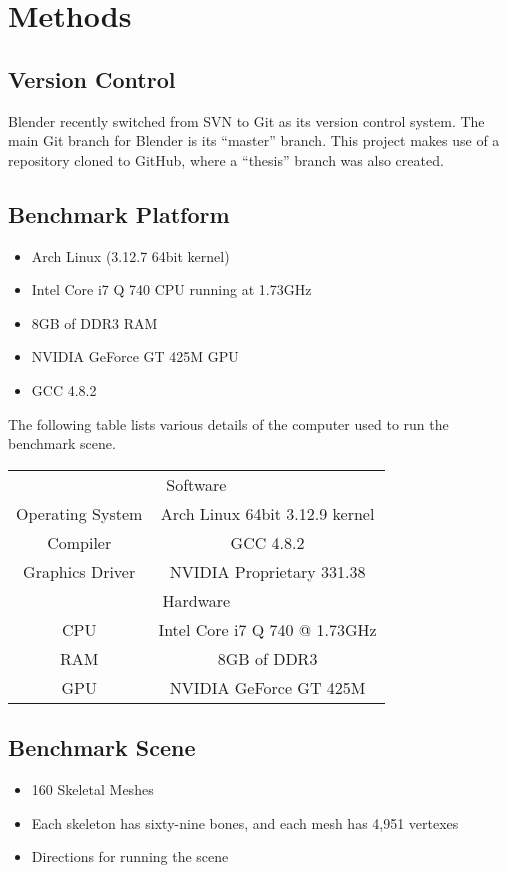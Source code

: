 \section{Methods}

\subsection{Version Control}
Blender recently switched from SVN\cite{svn} to Git\cite{git} as its version control system\cite{blendergit}.
The main Git branch for Blender is its ``master'' branch.
This project makes use of a repository cloned to GitHub\cite{github}, where a ``thesis'' branch was also created.

\subsection{Benchmark Platform}
\label{sec:bench_platform}
\ifsummaries
\begin{itemize}
 \item Arch Linux (3.12.7 64bit kernel)
 \item Intel Core i7 Q 740 CPU running at 1.73GHz
 \item 8GB of DDR3 RAM
 \item NVIDIA GeForce GT 425M GPU
 \item GCC 4.8.2
\end{itemize}
\fi

The following table lists various details of the computer used to run the benchmark scene.

\smallskip

\begin{center}
\begin{tabular}{cc}
 \hline
 \multicolumn{2}{c}{\cellcolor[gray]{0.8}Software} \\
 Operating System & Arch Linux 64bit 3.12.9 kernel \\
 Compiler & GCC 4.8.2 \\
 Graphics Driver & NVIDIA Proprietary 331.38\\
 \multicolumn{2}{c}{\cellcolor[gray]{0.8}Hardware} \\
 CPU & Intel Core i7 Q 740 @ 1.73GHz \\
 RAM & 8GB of DDR3 \\
 GPU & NVIDIA GeForce GT 425M \\
 \hline
\end{tabular}
\end{center}

\subsection{Benchmark Scene}
\label{sec:bench_scene}
\ifsummaries
\begin{itemize}
 \item 160 Skeletal Meshes
 \item Each skeleton has sixty-nine bones, and each mesh has 4,951 vertexes
 \item Directions for running the scene
\end{itemize}
\fi

